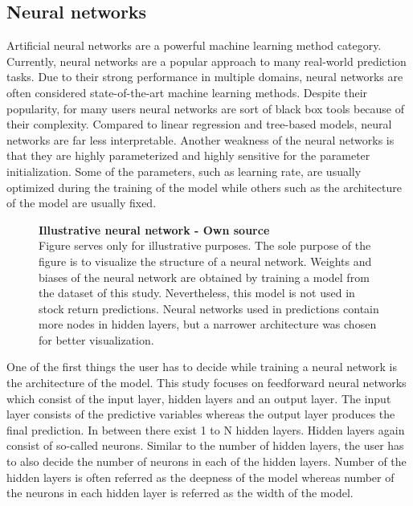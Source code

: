 \documentclass[12pt]{article}
\begin{document}
\subsection{Neural networks}

Artificial neural networks are a powerful machine learning method category. Currently, neural networks are a popular approach to many real-world prediction tasks. Due to their strong performance in multiple domains, neural networks are often considered state-of-the-art machine learning methods. Despite their popularity, for many users neural networks are sort of black box tools because of their complexity. Compared to linear regression and tree-based models, neural networks are far less interpretable. Another weakness of the neural networks is that they are highly parameterized and highly sensitive for the parameter initialization. Some of the parameters, such as learning rate, are usually optimized during the training of the model while others such as the architecture of the model are usually fixed.  \par

\begin{figure}[ht]
\centering
\caption[Illustrative neural network]{\textbf{Illustrative neural network \textnormal{- Own source}}\\  Figure serves only for illustrative purposes. The sole purpose of the figure is to visualize the structure of a neural network. Weights and biases of the neural network are obtained by training a model from the dataset of this study. Nevertheless, this model is not used in stock return predictions. Neural networks used in predictions contain more nodes in hidden layers, but a narrower architecture was chosen for better visualization.}

\label{plot:NN}
\end{figure}

One of the first things the user has to decide while training a neural network is the architecture of the model. This study focuses on feedforward neural networks which consist of the input layer, hidden layers and an output layer. The input layer consists of the predictive variables whereas the output layer produces the final prediction. In between there exist 1 to N hidden layers. Hidden layers again consist of so-called neurons. Similar to the number of hidden layers, the user has to also decide the number of neurons in each of the hidden layers. Number of the hidden layers is often referred as the deepness of the model whereas number of the neurons in each hidden layer is referred as the width of the model. \par
\end{document}
